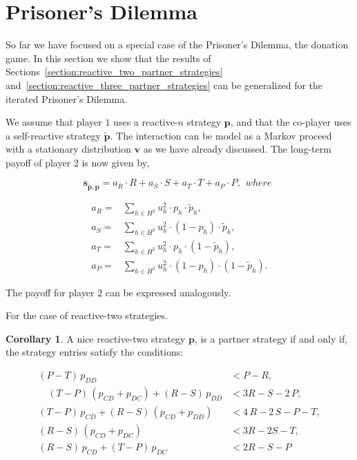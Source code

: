 \documentclass{article}
\theoremstyle{definition}
\newtheorem{corollary}{Corollary}[theorem]
\begin{document}
\section{Prisoner's Dilemma}

So far we have focused on a special case of the Prisoner's Dilemma, the donation
game. In this section we show that the results of Sections~\ref{section:reactive_two_partner_strategies}
and~\ref{section:reactive_three_partner_strategies} can be generalized
for the iterated Prisoner's Dilemma.

We assume that player $1$ uses a reactive-$n$ strategy \(\mathbf{p}\), and that
the co-player uses a self-reactive strategy \(\mathbf{\tilde{p}}\). The interaction
can be model as a Markov proceed with a stationary distribution \(\mathbf{v}\)
as we have already discussed. The long-term payoff of player $2$ is now given
by,

\begin{equation*}\label{eq:PD_long_term_payoff}
  \mathbf{s_{\mathbf{\tilde{p}}, \mathbf{p}}} = a_R \cdot R + a_S \cdot S + a_T \cdot T + a_P \cdot P, ~~where~~
\end{equation*}

\begin{equation*}
  \begin{array}{ll}
  a_R = & \displaystyle \sum_{h \in H^2} u^2_h \cdot p_h \cdot \tilde{p}_h, \\ [0.2cm]
  a_S = & \displaystyle \sum_{h \in H^2} u^2_h \cdot (1 - p_h) \cdot \tilde{p}_h, \\ [0.2cm]
  a_T = & \displaystyle \sum_{h \in H^2} u^2_h \cdot p_h \cdot (1 - \tilde{p}_h), \\ [0.2cm]
  a_P = &  \displaystyle \sum_{h \in H^2} u^2_h \cdot (1 - p_h) \cdot (1 - \tilde{p}_h).
\end{array}
\end{equation*}

The payoff for player $2$ can be expressed analogously.

For the case of reactive-two strategies.

\begin{corollary}\label{corollary:reactive_two_partner_strategies_PD}
A nice reactive-two strategy $\mathbf{p}$, is a partner strategy if and only if,
the strategy entries satisfy the conditions:

\begin{equation*}
  \begin{array}{rl}
    (P - T)\, p_{DD} & < P - R, \\ [0.2cm]
    \quad (T - P) \, (p_{CD} + p_{DC}) + (R - S)\,p_{DD} & < 3 R - S - 2\,P, \\ [0.2cm]
    (T - P)\, p_{CD} + (R - S)\, (p_{CD} + p_{DD}) & < 4\,R - 2\,S - P - T, \\ [0.2cm]
    (R - S)\,(p_{CD} + p_{DC}) & < 3 R - 2 S - T, \\ [0.2cm]
    \left(R - S\right)\, p_{CD} + \left(T - P\right)\,p_{DC} & < 2 R - S - P
\end{array}
\end{equation*}
\end{corollary}
\end{document}
